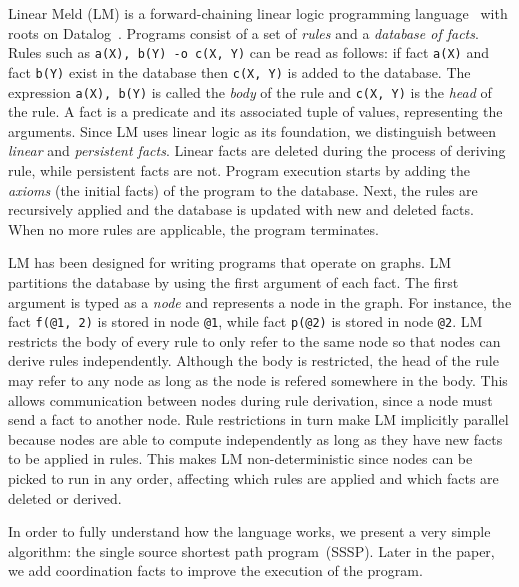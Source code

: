 Linear Meld (LM) is a forward-chaining linear logic programming
language~\cite{cruz-iclp14} with roots on Datalog~\cite{Ramakrishnan93asurvey}.
Programs consist of a set of \emph{rules} and a \emph{database of facts}.
Rules such as \texttt{a(X), b(Y) -o c(X, Y)} can be read as follows: if fact \texttt{a(X)}
and fact \texttt{b(Y)} exist in the database then \texttt{c(X, Y)} is added to
the database. The expression \texttt{a(X), b(Y)} is called the \emph{body} of
the rule and \texttt{c(X, Y)} is the \emph{head} of the rule.
A fact is a predicate and its associated tuple of values, representing the
arguments. Since LM uses linear logic as its foundation, we distinguish between
\emph{linear} and \emph{persistent facts}. Linear facts are deleted during the
process of deriving rule, while persistent facts are not.
Program execution starts by adding the \emph{axioms} (the initial facts) of the program to the database.
Next, the rules are recursively applied and the database is updated with new and
deleted facts. When no more rules are applicable, the program terminates.

LM has been designed for writing programs that operate on graphs. LM partitions
the database by using the first argument of each fact. The first argument is
typed as a \emph{node} and represents a node in the graph. For instance, the
fact \texttt{f(@1, 2)} is stored in node \texttt{@1}, while fact \texttt{p(@2)}
is stored in node \texttt{@2}. LM restricts
the body of every rule to only refer to the same node so that nodes can derive
rules independently. Although the body is restricted, the head of the
rule may refer to any node as long as the node is refered somewhere in the
body. This allows communication between nodes during rule derivation, since a
node must send a fact to another node.
Rule restrictions in turn make LM implicitly parallel because nodes are able to
compute independently as long as they have new facts to be applied in rules.
This makes LM non-deterministic since nodes can be picked to run in any order,
affecting which rules are applied and which facts are deleted or derived.

In order to fully understand how the language works, we present a very simple
algorithm: the single source shortest path program~(SSSP). Later in the paper, we
add coordination facts to improve the execution of the program.

